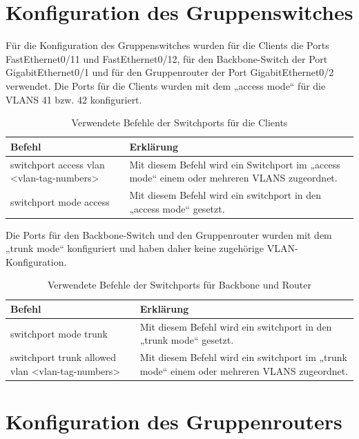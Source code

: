 \documentclass{article}
\begin{document}
\pagebreak
\section{Konfiguration des Gruppenswitches}

Für die Konfiguration des Gruppenswitches wurden für die Clients die Ports FastEthernet0/11 und FastEthernet0/12, für den Backbone-Switch der Port GigabitEthernet0/1 und für den Gruppenrouter der Port GigabitEthernet0/2 verwendet.
Die Ports für die Clients wurden mit dem „access mode“ für die VLANS 41 bzw. 42 konfiguriert.

\begin{table}[htbp]
    \centering
    \begin{tabularx}{\textwidth}{|X|X|}
        \toprule
        \textbf{Befehl} & \textbf{Erklärung} \\
        \midrule
        switchport access vlan <vlan-tag-numbers> & Mit diesem Befehl wird ein Switchport im „access mode“ einem oder mehreren VLANS zugeordnet.\\
        \hline
        switchport mode access & Mit diesem Befehl wird ein switchport in den „access mode“ gesetzt.\\
        \bottomrule
    \end{tabularx}
    \caption{Verwendete Befehle der Switchports für die Clients}
    \label{tab:commands}
\end{table}
\noindent Die Ports für den Backbone-Switch und den Gruppenrouter wurden mit dem „trunk mode“ konfiguriert und haben daher keine zugehörige VLAN-Konfiguration.

\begin{table}[htbp]
    \centering
    \begin{tabularx}{\textwidth}{|X|X|}
        \toprule
        \textbf{Befehl} & \textbf{Erklärung} \\
        \midrule
        switchport mode trunk & Mit diesem Befehl wird ein switchport in den „trunk mode“ gesetzt.\\
        \hline
         switchport trunk allowed vlan <vlan-tag-numbers> & Mit diesem Befehl wird ein switchport im „trunk mode“ einem oder mehreren VLANS zugeordnet.\\
        \bottomrule
    \end{tabularx}
    \caption{Verwendete Befehle der Switchports für Backbone und Router}
\end{table}

\section{Konfiguration des Gruppenrouters}
\end{document}
